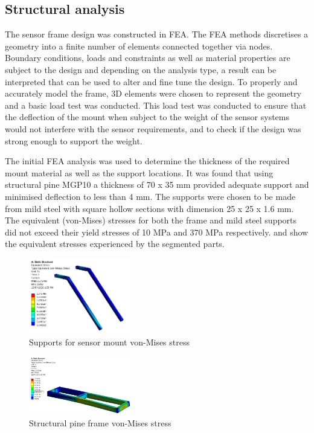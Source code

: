 \documentclass[main.tex]{subfiles}
\begin{document}
\subsection{Structural analysis}
The sensor frame design was constructed in FEA. The FEA methods discretises a geometry into a finite number of elements connected together via nodes. Boundary conditions, loads and constraints as well as material properties are subject to the design and depending on the analysis type, a result can be interpreted that can be used to alter and fine tune the design.  To properly and accurately model the frame, 3D elements were chosen to represent the geometry and a basic load test was conducted. This load test was conducted to ensure that the deflection of the mount when subject to the weight of the sensor systems would not interfere with the sensor requirements, and to check if the design was strong enough to support the weight.

The initial FEA analysis was used to determine the thickness of the required mount material as well as the support locations. It was found that using structural pine MGP10 a thickness of 70 x 35 mm provided adequate support and minimised deflection to less than 4 mm. The supports were chosen to be made from mild steel with square hollow sections with dimension 25 x 25 x 1.6 mm. The equivalent (von-Mises) stresses for both the frame and mild steel supports did not exceed their yield stresses of 10 MPa and 370 MPa respectively.  and  show the equivalent stresses experienced by the segmented parts. 

\begin{figure}[ht]
\includegraphics[width=0.4\textwidth]{4-DetailedDesign/top_frame.PNG}
\centering
\caption{Supports for sensor mount von-Mises stress} 
\end{figure}

\begin{figure}[ht]
\includegraphics[width=0.4\textwidth]{4-DetailedDesign/bottomframe.PNG}
\centering
\caption{Structural pine frame von-Mises stress} 
\end{figure}
\end{document}
